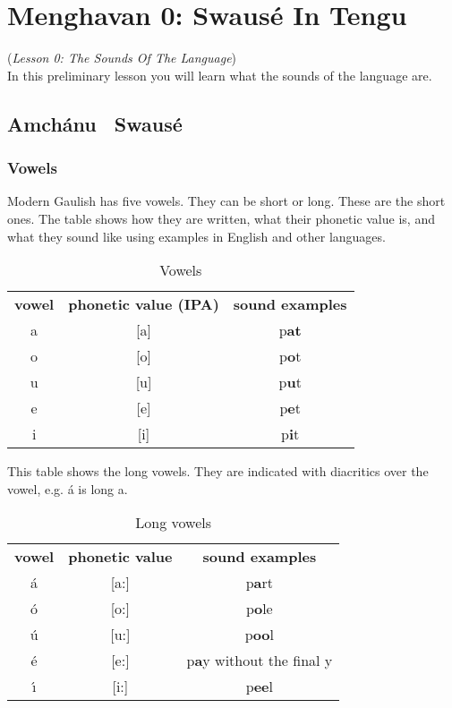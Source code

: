 \section{Menghavan 0: Swaus\'{e} In Tengu}
(\textit{Lesson 0: The Sounds Of The Language})\\

\noindent In this preliminary lesson you will learn what the sounds of the language are.

\subsection{Amch\'{a}nu \textendash\ Swaus\'{e}}
\subsubsection{Vowels}
\noindent Modern Gaulish has five vowels. They can be short or long. These are the short ones. The table shows how they are written, what their phonetic value is, and what they sound like using examples in English and other languages.

\begin{table}[H]
\begin{center}
\begin{tabular}{ccc}
  \toprule
  \textbf{vowel} & \textbf{phonetic value (IPA)} & \textbf{sound examples}\\
  \cmidrule(lr){1-1}\cmidrule(lr){2-2}\cmidrule(lr){3-3}
  a & [a] & p\textbf{at}\\
  o & [o] & p\textbf{o}t\\
  u & [u] & p\textbf{u}t\\
  e & [e] & p\textbf{e}t\\
  i & [i] & p\textbf{i}t\\
  \bottomrule
\end{tabular}
\end{center}
\caption{Vowels}
\label{phonology_vowels}
\end{table}

This table shows the long vowels. They are indicated with diacritics over the vowel, e.g. \'{a} is long a.

\begin{table}[H]
\begin{center}
\begin{tabular}{ccc}
  \toprule
  \textbf{vowel} & \textbf{phonetic value} & \textbf{sound examples}\\
  \cmidrule(lr){1-1}\cmidrule(lr){2-2}\cmidrule(lr){3-3}
  \'{a} & [a:] & p\textbf{a}rt\\
  \'{o} & [o:] & p\textbf{o}le\\
  \'{u} & [u:] & p\textbf{oo}l\\
  \'{e} & [e:] & p\textbf{a}y without the final y\\
  \'{\i} & [i:] & p\textbf{ee}l\\
  \bottomrule
\end{tabular}
\end{center}
\caption{Long vowels}
\label{phonology_long_vowels}
\end{table}

